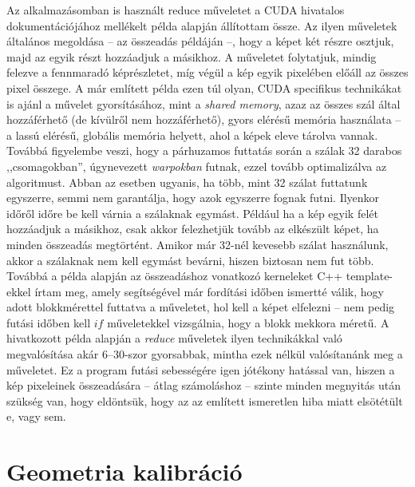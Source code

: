 \documentclass[a4paper,12pt]{article}
\begin{document}
Az alkalmazásomban is használt reduce műveletet  a CUDA hivatalos dokumentációjához mellékelt példa \cite{reduce} alapján állítottam össze. Az ilyen műveletek általános megoldása -- az összeadás példáján --, hogy a képet két részre osztjuk, majd az egyik részt hozzáadjuk a másikhoz. A műveletet folytatjuk, mindig felezve a fennmaradó képrészletet, míg végül a kép egyik pixelében előáll az összes pixel összege. A már említett példa ezen túl olyan, CUDA specifikus technikákat is ajánl a művelet gyorsításához, mint a \emph{shared memory}, azaz az összes szál által hozzáférhető (de kívülről nem hozzáférhető), gyors elérésű memória használata -- a lassú elérésű, globális memória helyett, ahol a képek eleve tárolva vannak. Továbbá figyelembe veszi, hogy a párhuzamos futtatás során a szálak 32 darabos ,,csomagokban'',  úgynevezett \emph{warpokban} futnak, ezzel tovább optimalizálva az algoritmust. Abban az esetben ugyanis, ha több, mint 32 szálat futtatunk egyszerre, semmi nem garantálja, hogy azok egyszerre fognak futni. Ilyenkor időről időre be kell várnia a szálaknak egymást. Például ha a kép egyik felét hozzáadjuk a másikhoz, csak akkor felezhetjük tovább az elkészült képet, ha minden összeadás megtörtént. Amikor már 32-nél kevesebb szálat használunk, akkor a szálaknak nem kell egymást bevárni, hiszen biztosan nem fut több. Továbbá a példa alapján az összeadáshoz vonatkozó kerneleket C++ template-ekkel írtam meg, amely segítségével már fordítási időben ismertté válik, hogy adott blokkmérettel futtatva a műveletet, hol kell a képet elfelezni -- nem pedig futási időben kell $if$ műveletekkel vizsgálnia, hogy a blokk mekkora méretű. A hivatkozott példa alapján a \emph{reduce} műveletek ilyen technikákkal való megvalósítása akár $6$--$30$-szor gyorsabbak, mintha ezek nélkül valósítanánk meg a műveletet. Ez a program futási sebességére igen jótékony hatással van, hiszen a kép pixeleinek összeadására -- átlag számoláshoz -- szinte minden megnyitás után szükség van, hogy eldöntsük, hogy az az említett ismeretlen hiba miatt elsötétült e, vagy sem. 




\section{Geometria kalibráció}
\label{sec:geomkalib}
\end{document}

